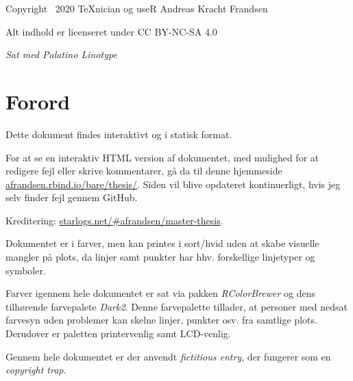 \documentclass[
  a4paper,
  oneside]{memoir}
\begin{document}
\newpage

\vspace*{\fill}

Copyright \textcopyright\, 2020 \TeX nician og useR Andreas Kracht Frandsen

Alt indhold er licenseret under CC BY-NC-SA 4.0

\textit{Sat med Palatino Linotype}

\newpage


{
  \hypersetup{linkcolor=black}
  \tableofcontents
}

\newpage

{
  \hypersetup{linkcolor=black}
  \listoffigures

  \listoftables
}

\newpage

\hypertarget{forord}{%
\chapter*{Forord}\label{forord}}

Dette dokument findes interaktivt og i statisk format.

For at se en interaktiv HTML version af dokumentet, med mulighed for at redigere fejl eller skrive kommentarer, gå da til denne hjemmeside \href{https://afrandsen.rbind.io/bare/thesis/}{afrandsen.rbind.io/bare/thesis/}. Siden vil blive opdateret kontinuerligt, hvis jeg selv finder fejl gennem GitHub.

\vfill

Kreditering: \href{http://starlogs.net/\#afrandsen/master-thesis}{starlogs.net/\#afrandsen/master-thesis}.

Dokumentet er i farver, men kan printes i sort/hvid uden at skabe visuelle mangler på plots, da linjer samt punkter har hhv. forskellige linjetyper og symboler.

Farver igennem hele dokumentet er sat via pakken \emph{RColorBrewer} og dens tilhørende farvepalete \emph{Dark2}. Denne farvepalette tillader, at personer med nedsat farvesyn uden problemer kan skelne linjer, punkter osv. fra samtlige plots. Derudover er paletten printervenlig samt LCD-venlig.

Gennem hele dokumentet er der anvendt \emph{fictitious entry}, der fungerer som en \emph{copyright trap}.

\newpage

\end{document}

